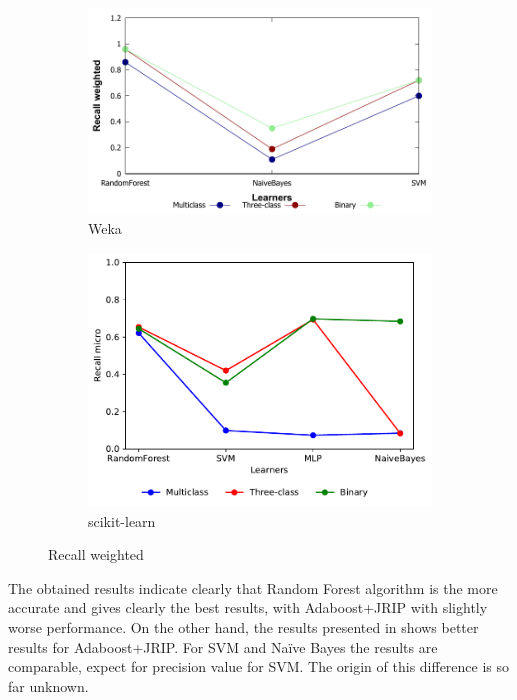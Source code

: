 \begin{figure}[H]
    \centering
    \begin{subfigure}[t]{0.5\textwidth}
        \includegraphics[width=\linewidth]{images/weka_recallweight}
        \caption{Weka}
    \end{subfigure}%
    \begin{subfigure}[t]{0.42\textwidth}
        \includegraphics[width=\linewidth, page = 3]{images/recall}
        \caption{scikit-learn}
    \end{subfigure}
    \caption{Recall weighted}
    \label{fig:recall_weight}
\end{figure}


The obtained results indicate clearly that Random Forest algorithm is the more accurate and gives clearly the best results, with Adaboost+JRIP with slightly worse performance. On the other hand, the results presented in \cite{borges_hink_machine_2014-1} shows better results for Adaboost+JRIP. For SVM and Naïve Bayes the results are comparable, expect for precision value for SVM. The origin of this difference is so far unknown.

